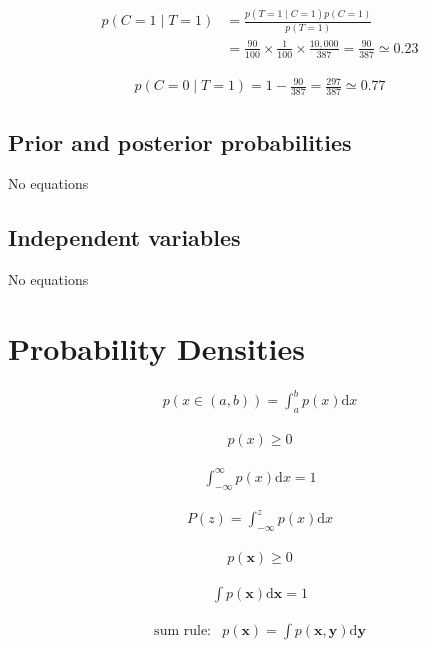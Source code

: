\documentclass{article}
\begin{document}
\begin{align*}
p(C=1 \mid T=1) & =\frac{p(T=1 \mid C=1) p(C=1)}{p(T=1)} \\
& =\frac{90}{100} \times \frac{1}{100} \times \frac{10,000}{387}=\frac{90}{387} \simeq 0.23
\tag{2.21}
\end{align*}

\begin{align*}
p(C=0 \mid T=1)=1-\frac{90}{387}=\frac{297}{387} \simeq 0.77
\tag{2.22}
\end{align*}

\subsection{Prior and posterior probabilities}
No equations

\subsection{Independent variables}
No equations

\section{Probability Densities}

\begin{align*}
p(x \in(a, b))=\int_{a}^{b} p(x) \mathrm{d} x
\tag{2.23}
\end{align*}

\begin{align*}
p(x) \geqslant 0
\tag{2.24}
\end{align*}

\begin{align*}
\int_{-\infty}^{\infty} p(x) \mathrm{d} x = 1
\tag{2.25}
\end{align*}

\begin{align*}
P(z) = \int_{-\infty}^{z} p(x) \mathrm{d} x
\tag{2.26}
\end{align*}

\begin{align*}
p(\mathbf{x}) \geqslant 0
\tag{2.27}
\end{align*}

\begin{align*}
\int p(\mathbf{x}) \mathrm{d} \mathbf{x} = 1
\tag{2.28}
\end{align*}

\begin{align*}
\text{sum rule:} & p(\mathbf{x}) = \int p(\mathbf{x}, \mathbf{y}) \mathrm{d} \mathbf{y}
\tag{2.29}
\end{align*}
\end{document}
